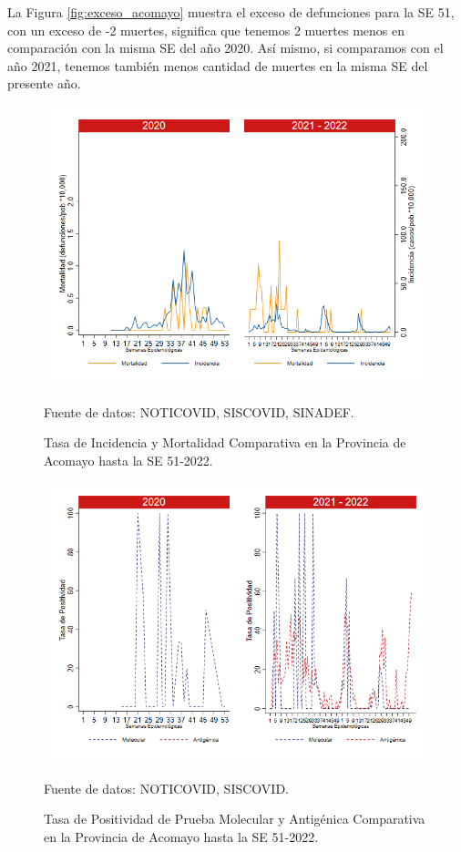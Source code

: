 \documentclass[12pt,a4paper,openany]{book}
\begin{document}
	La Figura \ref{fig:exceso_acomayo} muestra el exceso de defunciones para la SE 51, con un exceso de -2 muertes, significa que tenemos 2 muertes menos en comparación con la misma SE del año 2020. Así mismo, si comparamos con el año 2021, tenemos también menos cantidad de muertes en la misma SE del presente año.
	\begin{figure}[h]
		\caption{Tasa de Incidencia y Mortalidad Comparativa en la Provincia de Acomayo hasta la SE 51-2022.}\label{fig:inc_mort_acomayo}
		\begin{center}
			\includegraphics[width=0.70\linewidth]{../figuras/incidencia_mortalidad_20_21_1.png}
		\end{center}
		{\footnotesize {Fuente de datos: NOTICOVID, SISCOVID, SINADEF.}}
	\end{figure}
	
	\begin{figure}[h]
		\caption{Tasa de Positividad de Prueba Molecular y Antigénica Comparativa en la Provincia de Acomayo hasta la SE 51-2022. }\label{fig:positividad_acomayo}
		\begin{center}
			\includegraphics[width=0.7\linewidth]{../figuras/positividad_20_21_1.png}
		\end{center}
		{\footnotesize {Fuente de datos: NOTICOVID, SISCOVID.}}
	\end{figure}
	
\end{document}

